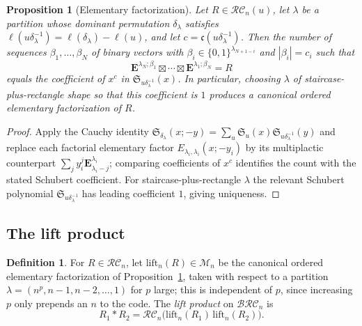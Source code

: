 \documentclass{amsart}
\newtheorem{proposition}[theorem]{Proposition}
\theoremstyle{definition}
\newtheorem{definition}[theorem]{Definition}
\theoremstyle{remark}
\newcommand{\BRC}{\mathcal{BRC}}
\newcommand{\RC}{\mathcal{RC}}
\newcommand{\dom}{\delta}
\newcommand{\Mn}{\mathcal{M}}
\newcommand{\code}{\mathfrak{c}}
\newcommand{\sch}{\mathfrak{S}}
\begin{document}
\begin{proposition}[Elementary factorization]\label{prop:elem_factor_min}
Let $R\in\RC_n(u)$, let $\lambda$ be a partition whose dominant permutation $\dom_\lambda$ satisfies $\ell(u\dom_\lambda^{-1})=\ell(\dom_\lambda)-\ell(u)$, and let $c=\code(u\dom_\lambda^{-1})$. Then the number of sequences $\beta_1,\ldots,\beta_N$ of binary vectors with $\beta_i\in\{0,1\}^{\lambda_{N+1-i}}$ and $|\beta_i|=c_i$ such that
\[
\mathbf{E}^{\lambda_N;\beta_1}\boxtimes\cdots\boxtimes\mathbf{E}^{\lambda_1;\beta_N}=R
\]
equals the coefficient of $x^c$ in $\sch_{u\dom_\lambda^{-1}}(x)$. In particular, choosing $\lambda$ of staircase-plus-rectangle shape so that this coefficient is $1$ produces a \emph{canonical} ordered elementary factorization of $R$.
\end{proposition}
\begin{proof}
Apply the Cauchy identity $\sch_{\dom_\lambda}(x;-y)=\sum_u\sch_u(x)\sch_{u\dom_\lambda^{-1}}(y)$ and replace each factorial elementary factor $E_{\lambda_i,\lambda_i}(x;-y_i)$ by its multiplactic counterpart $\sum_{j}y_i^j\mathbf{E}^{\lambda_i}_{\lambda_i-j}$; comparing coefficients of $x^c$ identifies the count with the stated Schubert coefficient. For staircase-plus-rectangle $\lambda$ the relevant Schubert polynomial $\sch_{u\dom_\lambda^{-1}}$ has leading coefficient $1$, giving uniqueness.
\end{proof}

\subsection{The lift product}\label{section:liftproduct}

\begin{definition}\label{definition:liftproduct}
For $R\in\RC_n$, let $\mathrm{lift}_n(R)\in\Mn_n$ be the canonical ordered elementary factorization of Proposition~\ref{prop:elem_factor_min}, taken with respect to a partition $\lambda=(n^{p},n-1,n-2,\ldots,1)$ for $p$ large; this is independent of $p$, since increasing $p$ only prepends an $n$ to the code. The \emph{lift product} on $\BRC_n$ is
\[
R_1*R_2=\RC_n\bigl(\mathrm{lift}_n(R_1)\,\mathrm{lift}_n(R_2)\bigr).
\]
\end{definition}
\end{document}
